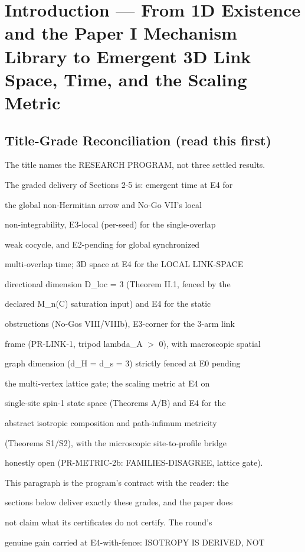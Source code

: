 \documentclass[11pt,a4paper]{article}
\theoremstyle{definition}
\begin{document}
\section{Introduction — From 1D Existence and the Paper I Mechanism Library to Emergent 3D Link Space, Time, and the Scaling Metric}

\subsection{Title-Grade Reconciliation (read this first)}

The title names the RESEARCH PROGRAM, not three settled results.

The graded delivery of Sections 2-5 is: emergent time at E4 for

the global non-Hermitian arrow and No-Go VII's local

non-integrability, E3-local (per-seed) for the single-overlap

weak cocycle, and E2-pending for global synchronized

multi-overlap time; 3D space at E4 for the LOCAL LINK-SPACE

directional dimension D\_loc = 3 (Theorem II.1, fenced by the

declared M\_n(C) saturation input) and E4 for the static

obstructions (No-Gos VIII/VIIIb), E3-corner for the 3-arm link

frame (PR-LINK-1, tripod lambda\_A $>$ 0), with macroscopic spatial

graph dimension (d\_H = d\_s = 3) strictly fenced at E0 pending

the multi-vertex lattice gate; the scaling metric at E4 on

single-site spin-1 state space (Theorems A/B) and E4 for the

abstract isotropic composition and path-infimum metricity

(Theorems S1/S2), with the microscopic site-to-profile bridge

honestly open (PR-METRIC-2b: FAMILIES-DISAGREE, lattice gate).

This paragraph is the program's contract with the reader: the

sections below deliver exactly these grades, and the paper does

not claim what its certificates do not certify. The round's

genuine gain carried at E4-with-fence: ISOTROPY IS DERIVED, NOT
\end{document}
